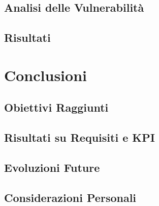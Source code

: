 \documentclass[a4paper,12pt]{report}
\begin{document}
	\section{Analisi delle Vulnerabilità}
	
	\section{Risultati}
	
	\chapter{Conclusioni}
	
	\section{Obiettivi Raggiunti}
	
	\section{Risultati su Requisiti e KPI}
	
	\section{Evoluzioni Future}
	
	\section{Considerazioni Personali}
	
\end{document}
